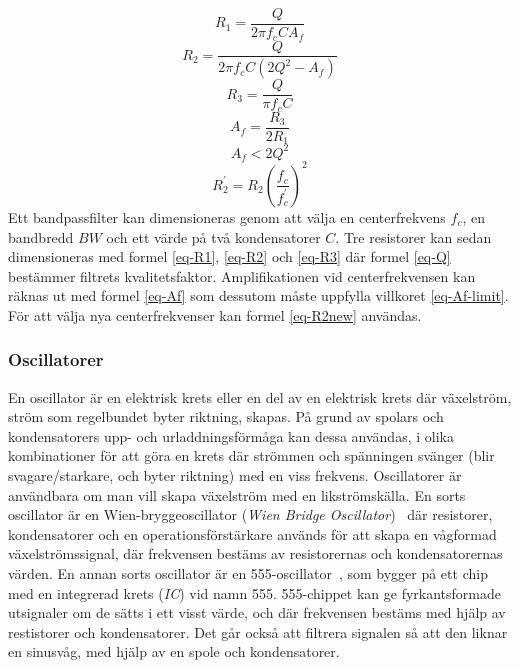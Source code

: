 \documentclass[a4paper]{article}
\makeatletter
\let\\\@raggedtwoe@savedcr%
\makeatother
\begin{document}
\begin{sloppypar}
    \begin{equation}
        \label{eq-R1}
        R_{1} =  \frac{Q}{2 \pi f_{c} C A_{f}}
    \end{equation}
    \begin{equation}
        \label{eq-R2}
        R_{2} =  \frac{Q}{2 \pi f_{c} C (2 Q^{2}- A_{f})}
    \end{equation}
    \begin{equation}
        \label{eq-R3}
        R_{3} =  \frac{Q}{\pi f_{c} C }
    \end{equation}
    \begin{equation}
        \label{eq-Af}
        A_{f} =  \frac{R_{3}}{2R_{1}}
    \end{equation}
    \begin{equation}
        \label{eq-Af-limit}
        A_{f} < 2 Q^{2}
    \end{equation}
    \begin{equation}
        \label{eq-R2new}
        R_{2}^{'} = R_{2} (\frac{f_{c}}{f_{c}^{'}})^{2}
    \end{equation}
    \noindent
    Ett bandpassfilter kan dimensioneras genom att välja en centerfrekvens $f_{c}$, en bandbredd $BW$ och ett värde på två kondensatorer $C$.
    Tre resistorer kan sedan dimensioneras med formel \ref{eq-R1}, \ref{eq-R2} och \ref{eq-R3} där formel \ref{eq-Q} bestämmer filtrets kvalitetsfaktor.
    Amplifikationen vid centerfrekvensen kan räknas ut med formel \ref{eq-Af} som dessutom måste uppfylla villkoret \ref{eq-Af-limit}.
    För att välja nya centerfrekvenser kan formel \ref{eq-R2new} användas.~\cite{Band-Pass-Filter}

    \subsubsection{Oscillatorer}
    En oscillator är en elektrisk krets eller en del av en elektrisk krets där växelström, ström som regelbundet byter riktning, skapas.
    På grund av spolars och kondensatorers upp- och urladdningsförmåga kan dessa användas, i olika kombinationer för att göra en krets där strömmen och spänningen svänger (blir svagare/starkare, och byter riktning) med en viss frekvens.
    Oscillatorer är användbara om man vill skapa växelström med en likströmskälla.
    \\\\
    En sorts oscillator är en Wien-bryggeoscillator (\textit{Wien Bridge Oscillator})~\cite{WienBridge} där resistorer, kondensatorer och en operationsförstärkare används för att skapa en vågformad växelströmssignal, där frekvensen bestäms av resistorernas och kondensatorernas värden.
    En annan sorts oscillator är en 555-oscillator~\cite{555_sine}, som bygger på ett chip med en integrerad krets (\textit{IC}) vid namn 555. 555-chippet kan ge fyrkantsformade utsignaler om de sätts i ett visst värde, och där frekvensen bestäms med hjälp av restistorer och kondensatorer. Det går också att filtrera signalen så att den liknar en sinusvåg, med hjälp av en spole och kondensatorer.


\end{sloppypar}
\end{document}
